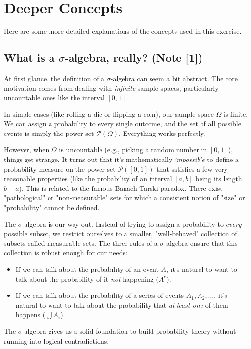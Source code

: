 \documentclass[11pt,a4paper]{article}
\begin{document}
\newpage
\section{Deeper Concepts}
Here are some more detailed explanations of the concepts used in this exercise.

\subsection{What is a \texorpdfstring{$\sigma$}{sigma}-algebra, really? (\hypertarget{note1}{Note [1]}) }
At first glance, the definition of a $\sigma$-algebra can seem a bit abstract. The core motivation comes from dealing with \textit{infinite} sample spaces, particularly uncountable ones like the interval $[0,1]$.

In simple cases (like rolling a die or flipping a coin), our sample space $\Omega$ is finite. We can assign a probability to every single outcome, and the set of all possible events is simply the power set $\mathcal{P}(\Omega)$. Everything works perfectly.

However, when $\Omega$ is uncountable (e.g., picking a random number in $[0,1]$), things get strange. It turns out that it's mathematically \textit{impossible} to define a probability measure on the power set $\mathcal{P}([0,1])$ that satisfies a few very reasonable properties (like the probability of an interval $[a,b]$ being its length $b-a$). This is related to the famous Banach-Tarski paradox. There exist "pathological" or "non-measurable" sets for which a consistent notion of "size" or "probability" cannot be defined.

The $\sigma$-algebra is our way out. Instead of trying to assign a probability to \textit{every} possible subset, we restrict ourselves to a smaller, "well-behaved" collection of subsets called measurable sets. The three rules of a $\sigma$-algebra ensure that this collection is robust enough for our needs:
\begin{itemize}
    \item If we can talk about the probability of an event $A$, it's natural to want to talk about the probability of it \textit{not} happening ($A^c$).
    \item If we can talk about the probability of a series of events $A_1, A_2, \ldots$, it's natural to want to talk about the probability that \textit{at least one} of them happens ($\bigcup A_i$).
\end{itemize}
The $\sigma$-algebra gives us a solid foundation to build probability theory without running into logical contradictions.
\end{document}
